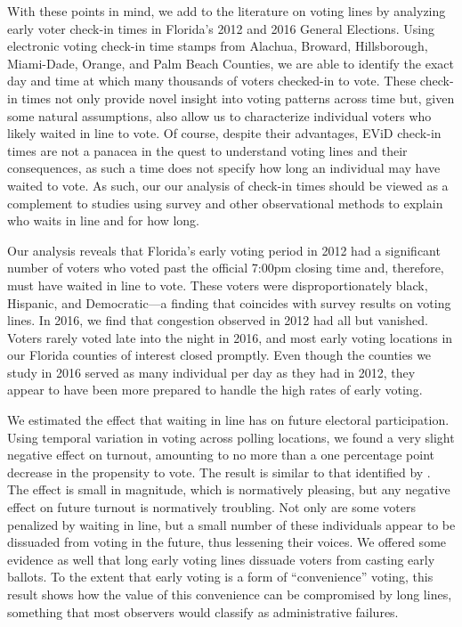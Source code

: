 \documentclass[12pt,titlepage]{article}
\begin{document}
With these points in mind, we add to the literature on voting lines by
analyzing early voter check-in times in Florida's 2012 and 2016
General Elections. Using electronic voting check-in time stamps from
Alachua, Broward, Hillsborough, Miami-Dade, Orange, and Palm Beach
Counties, we are able to identify the exact day and time at which many
thousands of voters checked-in to vote.  These check-in times not only
provide novel insight into voting patterns across time but, given some
natural assumptions, also allow us to characterize individual voters
who likely waited in line to vote. Of course, despite their advantages, 
EViD check-in times are not a panacea in the quest to understand voting 
lines and their consequences, as such a time does not specify how long 
an individual may have waited to vote.  As such, our our analysis of 
check-in times should be viewed as a complement to studies using 
survey and other observational methods to explain who waits in line 
and for how long.

Our analysis reveals that Florida's early voting period in 2012 had a
significant number of voters who voted past the official 7:00pm
closing time and, therefore, must have waited in line to vote.  These
voters were disproportionately black, Hispanic, and Democratic---a
finding that coincides with survey results on voting lines.  In 2016,
we find that congestion observed in 2012 had all but vanished.  Voters
rarely voted late into the night in 2016, and most early voting
locations in our Florida counties of interest closed promptly.  Even
though the counties we study in 2016 served as many individual per day
as they had in 2012, they appear to have been more prepared to handle
the high rates of early voting.
  
We estimated the effect that waiting in line has on future electoral
participation.  Using temporal variation in voting across polling
locations, we found a very slight negative effect on turnout,
amounting to no more than a one percentage point decrease in the
propensity to vote. The result is similar to that identified by
\citet{pettigrew:racegapwaittimes}.  The effect is small in magnitude,
which is normatively pleasing, but any negative effect on future
turnout is normatively troubling.  Not only are some voters penalized
by waiting in line, but a small number of these individuals appear to
be dissuaded from voting in the future, thus lessening their voices.
We offered some evidence as well that long early voting lines dissuade
voters from casting early ballots.  To the extent that early voting is
a form of ``convenience'' voting, this result shows how the value of
this convenience can be compromised by long lines, something that most
observers would classify as administrative failures.
\end{document}
